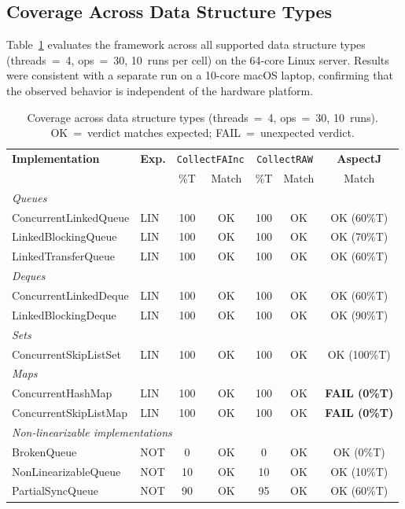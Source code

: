 \documentclass[preprint,12pt]{elsarticle}
\begin{document}
\subsection{Coverage Across Data Structure Types}

Table~\ref{tab:tableE} evaluates the framework across all supported
data structure types (threads~=~4, ops~=~30, 10~runs per cell) on the
64-core Linux server. Results were consistent with a separate run on a
10-core macOS laptop, confirming that the observed behavior is
independent of the hardware platform.

\begin{table}[h!]
\centering
\scriptsize
\caption{Coverage across data structure types (threads~=~4, ops~=~30,
         10~runs). OK~=~verdict matches expected;
         FAIL~=~unexpected verdict.}
\label{tab:tableE}
\begin{tabular}{llccccc}
\hline
\textbf{Implementation} & \textbf{Exp.}
  & \multicolumn{2}{c}{\texttt{CollectFAInc}}
  & \multicolumn{2}{c}{\texttt{CollectRAW}}
  & \textbf{AspectJ} \\
  & & \%T & Match & \%T & Match & Match \\
\hline
\multicolumn{7}{l}{\textit{Queues}} \\
ConcurrentLinkedQueue  & LIN & 100 & OK & 100 & OK & OK (60\%T) \\
LinkedBlockingQueue    & LIN & 100 & OK & 100 & OK & OK (70\%T) \\
LinkedTransferQueue    & LIN & 100 & OK & 100 & OK & OK (60\%T) \\
\multicolumn{7}{l}{\textit{Deques}} \\
ConcurrentLinkedDeque  & LIN & 100 & OK & 100 & OK & OK (60\%T) \\
LinkedBlockingDeque    & LIN & 100 & OK & 100 & OK & OK (90\%T) \\
\multicolumn{7}{l}{\textit{Sets}} \\
ConcurrentSkipListSet  & LIN & 100 & OK & 100 & OK & OK (100\%T) \\
\multicolumn{7}{l}{\textit{Maps}} \\
ConcurrentHashMap      & LIN & 100 & OK & 100 & OK & \textbf{FAIL (0\%T)} \\
ConcurrentSkipListMap  & LIN & 100 & OK & 100 & OK & \textbf{FAIL (0\%T)} \\
\multicolumn{7}{l}{\textit{Non-linearizable implementations}} \\
BrokenQueue            & NOT &   0 & OK &   0 & OK & OK (0\%T)  \\
NonLinearizableQueue   & NOT &  10 & OK &  10 & OK & OK (10\%T) \\
PartialSyncQueue       & NOT &  90 & OK &  95 & OK & OK (60\%T) \\
\hline
\end{tabular}
\end{table}
\end{document}
